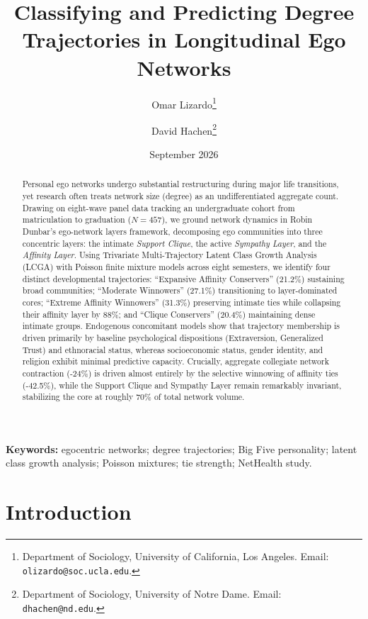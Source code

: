 \documentclass[12pt]{article}
\title{Classifying and Predicting Degree Trajectories in Longitudinal Ego Networks}
\author{
  Omar Lizardo\thanks{Department of Sociology, University of California, Los Angeles. Email: \texttt{olizardo@soc.ucla.edu}.}
  \and
  David Hachen\thanks{Department of Sociology, University of Notre Dame. Email: \texttt{dhachen@nd.edu}.}
}
\date{September 2026}
\begin{document}
\maketitle

\begin{abstract}
Personal ego networks undergo substantial restructuring during major life transitions, yet research often treats network size (degree) as an undifferentiated aggregate count. Drawing on eight-wave panel data tracking an undergraduate cohort from matriculation to graduation ($N = 457$), we ground network dynamics in Robin Dunbar's ego-network layers framework, decomposing ego communities into three concentric layers: the intimate \textit{Support Clique}, the active \textit{Sympathy Layer}, and the \textit{Affinity Layer}. Using Trivariate Multi-Trajectory Latent Class Growth Analysis (LCGA) with Poisson finite mixture models across eight semesters, we identify four distinct developmental trajectories: ``Expansive Affinity Conservers'' (21.2\%) sustaining broad communities; ``Moderate Winnowers'' (27.1\%) transitioning to layer-dominated cores; ``Extreme Affinity Winnowers'' (31.3\%) preserving intimate ties while collapsing their affinity layer by 88\%; and ``Clique Conservers'' (20.4\%) maintaining dense intimate groups. Endogenous concomitant models show that trajectory membership is driven primarily by baseline psychological dispositions (Extraversion, Generalized Trust) and ethnoracial status, whereas socioeconomic status, gender identity, and religion exhibit minimal predictive capacity. Crucially, aggregate collegiate network contraction (-24\%) is driven almost entirely by the selective winnowing of affinity ties (-42.5\%), while the Support Clique and Sympathy Layer remain remarkably invariant, stabilizing the core at roughly 70\% of total network volume.
\end{abstract}

\vspace{1em}
\noindent \textbf{Keywords:} egocentric networks; degree trajectories; Big Five personality; latent class growth analysis; Poisson mixtures; tie strength; NetHealth study.

\clearpage

\section{Introduction}
\end{document}
